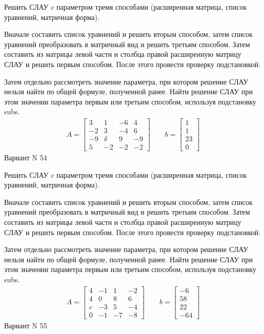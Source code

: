 \documentclass[11pt]{report}
\begin{document}
Решить СЛАУ c параметром тремя способами (расширенная матрица, список уравнений, матричная форма).

Вначале составить список уравнений и решить вторым способом,
затем список уравнений преобразовать в матричный вид и решить третьим способом.
Затем составить из матрицы левой части и столбца правой расширенную матрицу СЛАУ и решить первым способом.
После этого провести проверку подстановкой.

Затем отдельно рассмотреть значение параметра, при котором решение СЛАУ нельзя найти по общей формуле,
полученной ранее.
Найти решение СЛАУ при этом значении параметра первым или третьим способом, используя подстановку subs.
\begin{align*}
    A = \left[\begin{matrix}3 & 1 & -6 & 4\\-2 & 3 & -4 & 6\\-9 & \delta & 9 & -9\\5 & -2 & -2 & -2\end{matrix}\right]
\qquad b = \left[\begin{matrix}1\\1\\23\\0\end{matrix}\right]
\end{align*}
\newpage
Вариант N 54


Решить СЛАУ c параметром тремя способами (расширенная матрица, список уравнений, матричная форма).

Вначале составить список уравнений и решить вторым способом,
затем список уравнений преобразовать в матричный вид и решить третьим способом.
Затем составить из матрицы левой части и столбца правой расширенную матрицу СЛАУ и решить первым способом.
После этого провести проверку подстановкой.

Затем отдельно рассмотреть значение параметра, при котором решение СЛАУ нельзя найти по общей формуле,
полученной ранее.
Найти решение СЛАУ при этом значении параметра первым или третьим способом, используя подстановку subs.
\begin{align*}
    A = \left[\begin{matrix}4 & -1 & 1 & -2\\4 & 0 & 8 & 6\\c & -3 & 5 & -4\\0 & -1 & -7 & -8\end{matrix}\right]
\qquad b = \left[\begin{matrix}-6\\58\\22\\-64\end{matrix}\right]
\end{align*}
\newpage
Вариант N 55
\end{document}
